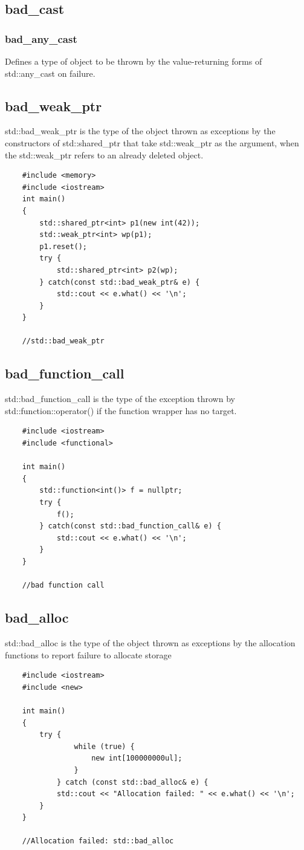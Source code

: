 \documentclass[UTF8,a4paper,12pt]{ctexbook}
\begin{document}
		\subsection{bad\_cast}
			\subsubsection{bad\_any\_cast}
				Defines a type of object to be thrown by the value-returning forms of std::any\_cast on failure. 
		\subsection{bad\_weak\_ptr}
			std::bad\_weak\_ptr is the type of the object thrown as exceptions by the constructors of std::shared\_ptr that take std::weak\_ptr as the argument, when the std::weak\_ptr refers to an already deleted object. 
\begin{lstlisting}
	#include <memory>
	#include <iostream>
	int main()
	{
		std::shared_ptr<int> p1(new int(42));
		std::weak_ptr<int> wp(p1);
		p1.reset();
		try {
			std::shared_ptr<int> p2(wp);
		} catch(const std::bad_weak_ptr& e) {
			std::cout << e.what() << '\n';
		}
	}
	
	//std::bad_weak_ptr
\end{lstlisting}
		\subsection{bad\_function\_call}
			std::bad\_function\_call is the type of the exception thrown by std::function::operator() if the function wrapper has no target. 
\begin{lstlisting}
	#include <iostream>
	#include <functional>
	
	int main()
	{
		std::function<int()> f = nullptr;
		try {
			f();
		} catch(const std::bad_function_call& e) {
			std::cout << e.what() << '\n';
		}
	}
	
	//bad function call
\end{lstlisting}
		\subsection{bad\_alloc}
			std::bad\_alloc is the type of the object thrown as exceptions by the allocation functions to report failure to allocate storage
\begin{lstlisting}
	#include <iostream>
	#include <new>
	
	int main()
	{
		try {
				while (true) {
					new int[100000000ul];
				}
			} catch (const std::bad_alloc& e) {
			std::cout << "Allocation failed: " << e.what() << '\n';
		}
	}
	
	//Allocation failed: std::bad_alloc
\end{lstlisting}
\end{document}
